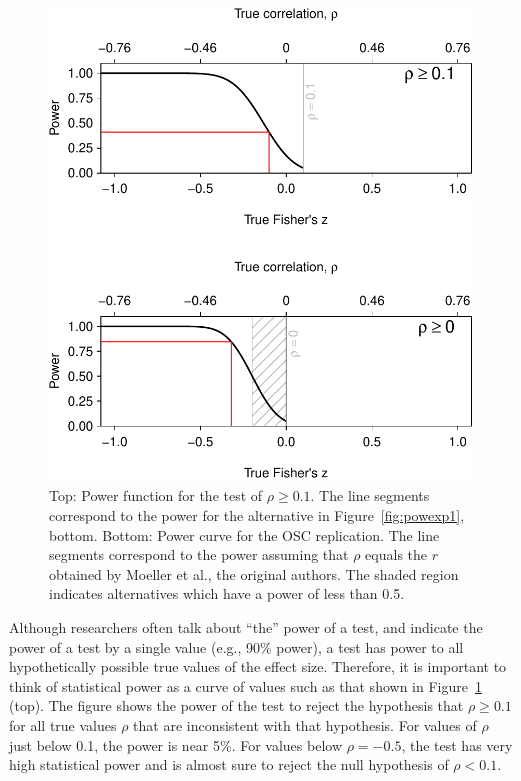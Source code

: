 \documentclass[doc,a4paper,floatsintext,draftfirst]{apa6}
\makeatletter
\def\maxwidth{ %
  \ifdim\Gin@nat@width>\linewidth
    \linewidth
  \else
    \Gin@nat@width
  \fi
}
\makeatother
\begin{document}
\begin{figure}
\includegraphics[width=\maxwidth]{figure/powexp2-1} \caption{Top: Power function for the test of $\rho\geq0.1$. The line segments correspond to the power for the alternative in Figure~\ref{fig:powexp1}, bottom. Bottom: Power curve for the OSC replication. The line segments correspond to the power assuming that $\rho$ equals the $r$ obtained by Moeller et al., the original authors. The shaded region indicates alternatives which have a power of less than 0.5.}\label{fig:powexp2}
\end{figure}

Although researchers often talk about ``the'' power of a test, and indicate the power of a test by a single value (e.g., 90\% power), a test has power to all hypothetically possible true values of the effect size. Therefore, it is important to think of statistical power as a curve of values such as that shown in Figure~\ref{fig:powexp2} (top). The figure shows the power of the test to reject the hypothesis that $\rho\geq0.1$ for all true values $\rho$ that are inconsistent with that hypothesis. For values of $\rho$ just below 0.1, the power is near 5\%. For values below $\rho=-0.5$, the test has very high statistical power and is almost sure to reject the null hypothesis of $\rho<0.1$. 
\end{document}

